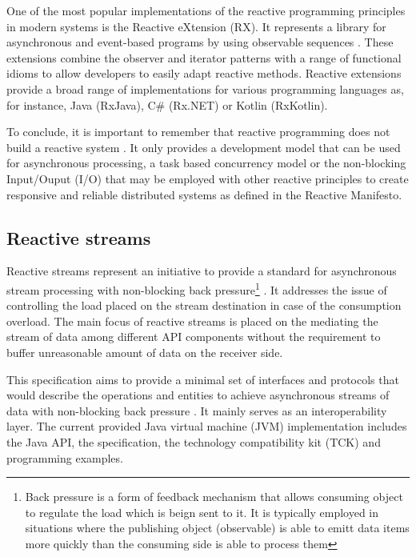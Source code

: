 \documentclass[oneside,
  digital, %
  table,   %
  nolof,     %
  nolot,     %
]{fithesis3}
\begin{document}
One of the most popular implementations of the reactive programming principles in modern systems is the Reactive eXtension (RX). It represents a library for asynchronous and event-based programs by using observable sequences \cite{rxJava}. These extensions combine the observer and iterator patterns with a range of functional idioms to allow developers to easily adapt reactive methods. Reactive extensions provide a broad range of implementations for various programming languages as, for instance, Java (RxJava), C\# (Rx.NET) or Kotlin (RxKotlin). 

To conclude, it is important to remember that reactive programming does not build a reactive system \cite{5thingsAboutRP_RHDev}. It only provides a development model that can be used for asynchronous processing, a task based concurrency model or the non-blocking Input/Ouput (I/O) that may be employed with other reactive principles to create responsive and reliable distributed systems as defined in the Reactive Manifesto.

\subsection{Reactive streams}

Reactive streams represent an initiative to provide a standard for asynchronous stream processing with non-blocking back pressure\footnote{Back pressure is a form of feedback mechanism that allows consuming object to regulate the load which is beign sent to it. It is typically employed in situations where the publishing object (observable) is able to emitt data items more quickly than the consuming side is able to process them} \cite{reactive_streams}. It addresses the issue of controlling the load placed on the stream destination in case of the consumption overload. The main focus of reactive streams is placed on the mediating the stream of data among different API components without the requirement to buffer unreasonable amount of data on the receiver side. 

This specification aims to provide a minimal set of interfaces and protocols that would describe the operations and entities to achieve asynchronous streams of data with non-blocking back pressure \cite{building_reactive_ms_in_java}. It mainly serves as an interoperability layer. The current provided Java virtual machine (JVM) implementation includes the Java API, the specification, the technology compatibility kit (TCK) and programming examples. 
\end{document}
